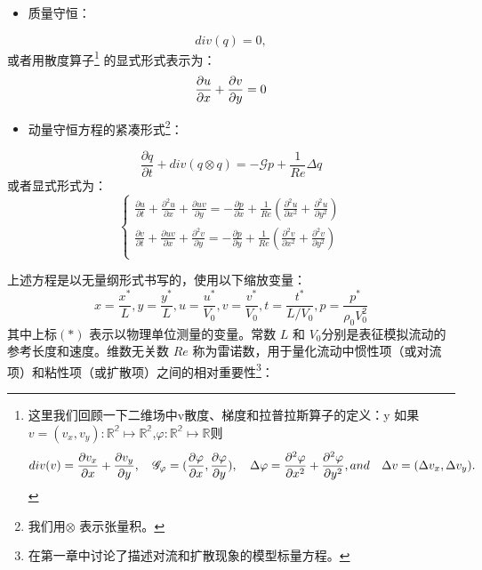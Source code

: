 \documentclass[12pt, a4paper]{article}
\numberwithin{equation}{section} %
\begin{document}
\begin{itemize}
    \item 质量守恒：
\end{itemize}
\begin{equation}
div(q) = 0,
\end{equation}或者用散度算子\footnote{
这里我们回顾一下二维场中v散度、梯度和拉普拉斯算子的定义：y
如果 $v = (v_x,v_y): \mathbb{R^2} \mapsto \mathbb{R^2}$,$\varphi:\mathbb{R^2} \mapsto \mathbb{R}$则
\begin{equation}
div(v) = \frac{\partial v_x}{\partial x} + \frac{\partial v_y}{\partial y}, \quad 
\mathscr{G}_\varphi = (\frac{\partial \varphi}{\partial x} , \frac{\partial \varphi}{\partial y}),\quad
\Delta{\varphi}   =  \frac{\partial ^2 \varphi}{\partial x^2} + \frac{\partial ^2 \varphi}{\partial y^2},\quad \\ and\quad\Delta{v}   =  (\Delta{v_x},\Delta{v_y}).
\notag
\end{equation}} 的显式形式表示为：
\begin{equation}
\frac{\partial u}{\partial x} + \frac{\partial v}{\partial y} = 0
\label{eq:div}
\notag
\end{equation}
\begin{itemize}
    \item 动量守恒方程的紧凑形式\footnote{我们用$\otimes$ 表示张量积。}：
\end{itemize}
\begin{equation}
\frac{\partial q}{\partial t} + div(q\otimes q) = -\mathscr{G}p + \frac{1}{Re} \Delta q 
\end{equation}
或者显式形式为：
\begin{equation}
\left\{
\begin{aligned}
\frac{\partial u}{\partial t} + \frac{\partial ^2 u}{\partial x}+ \frac{\partial uv}{\partial y} = -\frac{\partial p}{\partial x} + \frac{1}{Re} (\frac{\partial ^2 u}{\partial x^2}+\frac{\partial ^2 u}{\partial y^2})\\
\frac{\partial v}{\partial t} + \frac{\partial uv}{\partial x}+ \frac{\partial ^2 v}{\partial y} = -\frac{\partial p}{\partial y} + \frac{1}{Re} (\frac{\partial ^2 v}{\partial x^2}+\frac{\partial ^2 v}{\partial y^2})\\
\end{aligned}
\right.
\label{eq:ns}
\end{equation}




上述方程是以无量纲形式书写的，使用以下缩放变量：
\begin{equation}
x = \frac{x^{\ast}}{L},y = \frac{y^{\ast}}{L},u = \frac{u^{\ast}}{V_0},v=\frac{v^{\ast}}{V_0},t =\frac{t^{\ast}}{L/{V_0}},p =\frac{p^{\ast}}{\rho_0 V_0^2}
\end{equation}
其中上标$(\ast)$ 表示以物理单位测量的变量。常数 $L$ 和 $V_0 $分别是表征模拟流动的参考长度和速度。维数无关数 $Re$ 称为雷诺数，用于量化流动中惯性项（或对流项）和粘性项（或扩散项）之间的相对重要性\footnote{在第一章中讨论了描述对流和扩散现象的模型标量方程。}：
\end{document}
